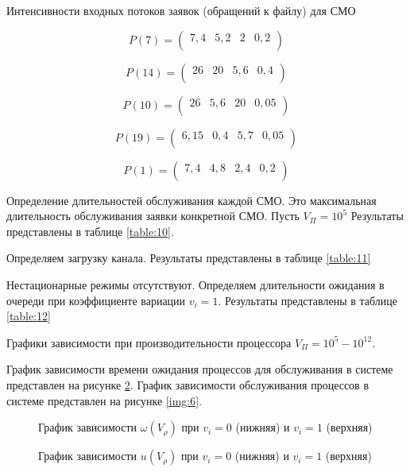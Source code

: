 Интенсивности входных потоков заявок (обращений к файлу) для СМО

\[
P(7) = 
\begin{pmatrix}
7,4 & 5,2 & 2 & 0,2\\
\end{pmatrix}
\]

\[
P(14) = 
\begin{pmatrix}
26 & 20 & 5,6 & 0,4\\
\end{pmatrix}
\]

\[
P(10) = 
\begin{pmatrix}
26 & 5,6 & 20 & 0,05\\
\end{pmatrix}
\]

\[
P(19) = 
\begin{pmatrix}
6,15 & 0,4 & 5,7 & 0,05\\
\end{pmatrix}
\]

\[
P(1) = 
\begin{pmatrix}
7,4 & 4,8 & 2,4 & 0,2\\
\end{pmatrix}
\]

Определение длительностей обслуживания каждой СМО. Это максимальная длительность обслуживания заявки конкретной СМО. Пусть $V_\Pi = 10^5$ Результаты представлены в таблице \ref{table:10}.



Определяем загрузку канала. Результаты представлены в таблице \ref{table:11}



Нестационарные режимы отсутствуют. Определяем длительности ожидания в очереди при коэффициенте вариации $v_i = 1$. Результаты представлены в таблице \ref{table:12}



Графики зависимости при производительности процессора $V_\Pi = 10^5 - 10^{12}$.

График зависимости времени ожидания процессов для обслуживания в системе представлен на рисунке \ref{img:5}. График зависимости обслуживания процессов в системе представлен на рисунке \ref{img:6}.

\begin{figure}[H]
	\renewcommand{\figurename}{Рисунок}
	\caption{График зависимости $\omega(V_\rho)$ при $v_i = 0$ (нижняя) и $v_i = 1$ (верхняя)}
	\label{img:5}
\end{figure}

\begin{figure}[H]
	\renewcommand{\figurename}{Рисунок}
	\caption{График зависимости $u(V_\rho)$ при $v_i = 0$ (нижняя) и $v_i = 1$ (верхняя)}
	\label{img:5}
\end{figure}


\newpage



